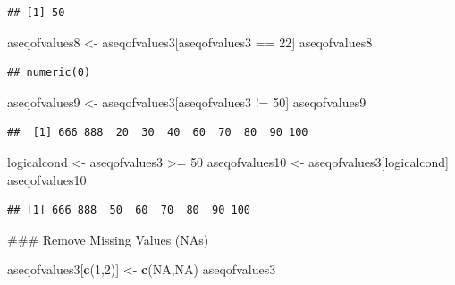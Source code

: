 \documentclass[]{book}
\newenvironment{Shaded}{\begin{snugshade}}{\end{snugshade}}
\newcommand{\KeywordTok}[1]{\textcolor[rgb]{0.13,0.29,0.53}{\textbf{{#1}}}}
\newcommand{\DecValTok}[1]{\textcolor[rgb]{0.00,0.00,0.81}{{#1}}}
\newcommand{\StringTok}[1]{\textcolor[rgb]{0.31,0.60,0.02}{{#1}}}
\newcommand{\OtherTok}[1]{\textcolor[rgb]{0.56,0.35,0.01}{{#1}}}
\newcommand{\NormalTok}[1]{{#1}}
\begin{document}
\begin{verbatim}
## [1] 50
\end{verbatim}

\begin{Shaded}
\begin{Highlighting}[]
\NormalTok{aseqofvalues8 <-}\StringTok{ }\NormalTok{aseqofvalues3[aseqofvalues3 ==}\StringTok{ }\DecValTok{22}\NormalTok{]}
\NormalTok{aseqofvalues8}
\end{Highlighting}
\end{Shaded}

\begin{verbatim}
## numeric(0)
\end{verbatim}

\begin{Shaded}
\begin{Highlighting}[]
\NormalTok{aseqofvalues9 <-}\StringTok{ }\NormalTok{aseqofvalues3[aseqofvalues3 !=}\StringTok{ }\DecValTok{50}\NormalTok{]}
\NormalTok{aseqofvalues9}
\end{Highlighting}
\end{Shaded}

\begin{verbatim}
##  [1] 666 888  20  30  40  60  70  80  90 100
\end{verbatim}

\begin{Shaded}
\begin{Highlighting}[]
\NormalTok{logicalcond <-}\StringTok{ }\NormalTok{aseqofvalues3 >=}\StringTok{ }\DecValTok{50}
\NormalTok{aseqofvalues10 <-}\StringTok{ }\NormalTok{aseqofvalues3[logicalcond]}
\NormalTok{aseqofvalues10}
\end{Highlighting}
\end{Shaded}

\begin{verbatim}
## [1] 666 888  50  60  70  80  90 100
\end{verbatim}

\begin{Shaded}
\begin{Highlighting}[]
\NormalTok{### Remove Missing Values (NAs)}

\NormalTok{aseqofvalues3[}\KeywordTok{c}\NormalTok{(}\DecValTok{1}\NormalTok{,}\DecValTok{2}\NormalTok{)] <-}\StringTok{ }\KeywordTok{c}\NormalTok{(}\OtherTok{NA}\NormalTok{,}\OtherTok{NA}\NormalTok{)}
\NormalTok{aseqofvalues3}
\end{Highlighting}
\end{Shaded}
\end{document}
